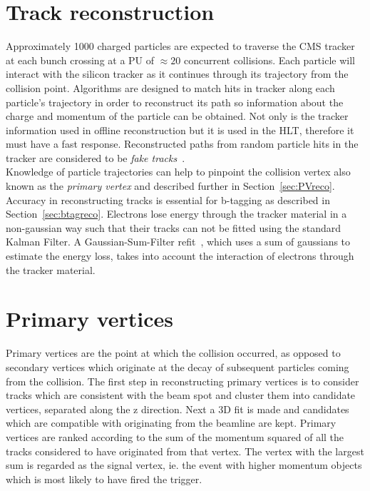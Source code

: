 \section{Track reconstruction}

Approximately 1000 charged particles are expected to traverse the CMS tracker at each bunch crossing at a PU of $\approx 20$ concurrent collisions. Each particle will interact with the silicon tracker as it continues through its trajectory from the collision point. Algorithms are designed to match hits in tracker along each particle's trajectory in order to reconstruct its path so information about the charge and momentum of the particle can be obtained. Not only is the tracker information used in offline reconstruction but it is used in the HLT, therefore it must have a fast response. Reconstructed paths from random particle hits in the tracker are considered to be \emph{fake tracks}~\cite{1748-0221-9-10-P10009}.\\
Knowledge of particle trajectories can help to pinpoint the collision vertex also known as the \emph{primary vertex} and described further in Section~\ref{sec:PVreco}. Accuracy in reconstructing tracks is essential for b-tagging as described in Section~\ref{sec:btagreco}.
Electrons lose energy through the tracker material in a non-gaussian way such that their tracks can not be fitted using the standard Kalman Filter. A Gaussian-Sum-Filter refit~\cite{GSF_Electron_Reconstruction_CMS}, which uses a sum of gaussians to estimate the energy loss, takes into account the interaction of electrons through the tracker material.


\section{Primary vertices \label{sec:PVreco}}

Primary vertices are the point at which the collision occurred, as opposed to secondary vertices which originate at the decay of subsequent particles coming from the collision. The first step in reconstructing primary vertices is to consider tracks which are consistent with the beam spot and cluster them into candidate vertices, separated along the z direction. Next a 3D fit is made and candidates which are compatible with originating from the beamline are kept. Primary vertices are ranked according to the sum of the momentum squared of all the tracks considered to have originated from that vertex. The vertex with the largest sum is regarded as the signal vertex, ie. the event with higher momentum objects which is most likely to have fired the trigger. 


